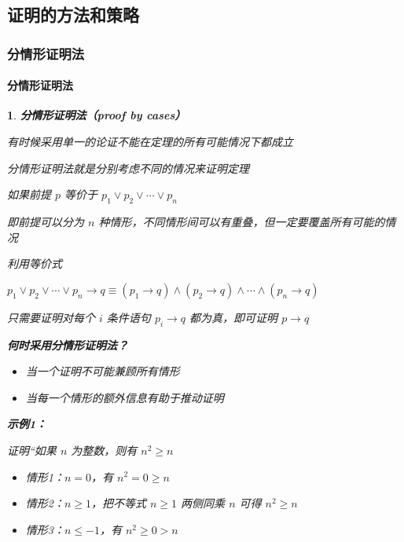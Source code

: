 \documentclass[UTF8]{report}
\theoremstyle{MyLineTheoremStyle} %
\theoremstyle{MyBlockTheoremStyle} %
\theoremstyle{MySubsubsectionStyle} %
\newtheorem{definition}{}
\begin{document}
\subsection{证明的方法和策略}

\subsubsection{分情形证明法}

\paragraph{分情形证明法}

\begin{definition}
    \textbf{分情形证明法（proof by cases）}\par
    有时候采用单一的论证不能在定理的所有可能情况下都成立\par
    分情形证明法就是分别考虑不同的情况来证明定理\par
    如果前提 $p$ 等价于 $p_1 \lor p_2 \lor \cdots \lor p_n$\par
    即前提可以分为 $n$ 种情形，不同情形间可以有重叠，但一定要覆盖所有可能的情况\par
    利用等价式\par
    $p_1 \lor p_2 \lor \cdots \lor p_n \rightarrow q \equiv (p_1 \rightarrow q) \land (p_2 \rightarrow q) \land \cdots \land (p_n \rightarrow q)$\par
    只需要证明对每个 $i$ 条件语句 $p_i \rightarrow q$ 都为真，即可证明 $p \rightarrow q$\par

    \textbf{何时采用分情形证明法？}\par
    \begin{itemize}
        \item 当一个证明不可能兼顾所有情形
        \item 当每一个情形的额外信息有助于推动证明
    \end{itemize}

    \textbf{示例1：}\par
    证明“如果 $n$ 为整数，则有 $n^2 \geq n$\par
    \begin{itemize}
        \item 情形1：$n = 0$，有 $n^2 = 0 \geq n$
        \item 情形2：$n \geq 1$，把不等式 $n \geq 1$ 两侧同乘 $n$ 可得 $n^2 \geq n$
        \item 情形3：$n \leq -1$，有 $n^2 \geq 0 > n$
    \end{itemize}


\end{definition}
\end{document}
